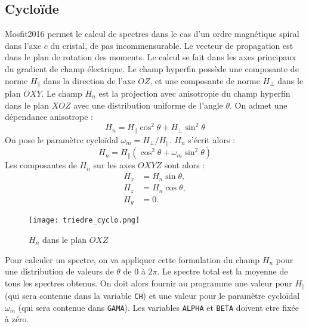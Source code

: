 \subsection{Cyclo\"ide}
Mosfit2016 permet le calcul de spectres dans le cas d'un ordre magnétique spiral dans l'axe $c$ du cristal, de pas incommensurable. 
Le vecteur de propagation est dans le plan de rotation des moments.
Le calcul se fait dans les axes principaux du gradient de champ électrique.
Le champ hyperfin possède une composante de norme $H_\parallel$ dans la direction de l'axe $OZ$, et une composante de norme $H_\perp$ dans le plan $OXY$.
Le champ $H_n$ est la projection avec anisotropie du champ hyperfin dans le plan $XOZ$ avec une distribution uniforme de l'angle $\theta$.
On admet une dépendance anisotrope :
\begin{equation}
  H_n = H_{\parallel}\cos^2  \theta + H_{\perp}\sin^2\theta
\end{equation}
On pose le paramètre cyclo\"idal $\omega_m = H_{\perp}/ H_{\parallel}$.
$H_n$ s'écrit alors :
\begin{equation}
  H_n = H_{\parallel}( \cos^2\theta + \omega_m \sin^2 \theta)
\end{equation}
Les composantes de $H_n$ sur les axes $OXYZ$ sont alors :
\begin{align*}
  H_x &= H_n \sin \theta,\\
  H_z &= H_n \cos \theta,\\
  H_y &= 0.
\end{align*}

\begin{figure}[!h]
\centering
\texttt{[image: triedre\_cyclo.png]}
\caption{\label{fig:cycloide}$H_n$ dans le plan $OXZ$}
\end{figure}

Pour calculer un spectre, on va appliquer cette formulation du champ $H_n$ pour une distribution de valeurs de $\theta$ de $0$ à $2\pi$. 
Le spectre total est la moyenne de tous les spectres obtenus.
On doit alors fournir au programme une valeur pour $H_{\parallel}$ (qui sera contenue dans la variable \lstinline{CH}) et une valeur pour le paramètre cyclo\"idal $\omega_m$ (qui sera contenue dans \lstinline{GAMA}).
Les variables \lstinline{ALPHA} et \lstinline{BETA} doivent etre fixée à zéro.

